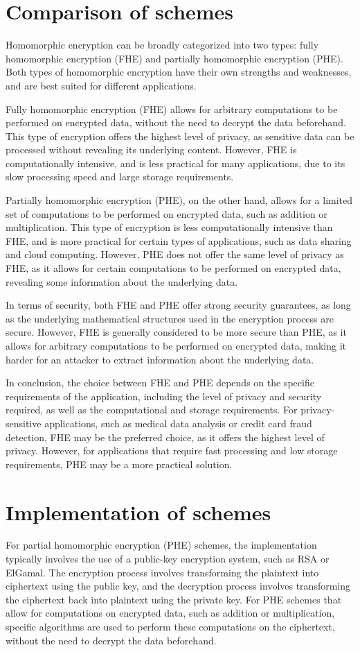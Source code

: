 \documentclass[a4paper,11pt]{report}
\begin{document}
\section{Comparison of schemes}
Homomorphic encryption can be broadly categorized into two types: fully homomorphic encryption (FHE) and partially homomorphic encryption (PHE). Both types of homomorphic encryption have their own strengths and weaknesses, and are best suited for different applications.

Fully homomorphic encryption (FHE) allows for arbitrary computations to be performed on encrypted data, without the need to decrypt the data beforehand. This type of encryption offers the highest level of privacy, as sensitive data can be processed without revealing its underlying content. However, FHE is computationally intensive, and is less practical for many applications, due to its slow processing speed and large storage requirements.

Partially homomorphic encryption (PHE), on the other hand, allows for a limited set of computations to be performed on encrypted data, such as addition or multiplication. This type of encryption is less computationally intensive than FHE, and is more practical for certain types of applications, such as data sharing and cloud computing. However, PHE does not offer the same level of privacy as FHE, as it allows for certain computations to be performed on encrypted data, revealing some information about the underlying data.

In terms of security, both FHE and PHE offer strong security guarantees, as long as the underlying mathematical structures used in the encryption process are secure. However, FHE is generally considered to be more secure than PHE, as it allows for arbitrary computations to be performed on encrypted data, making it harder for an attacker to extract information about the underlying data.

In conclusion, the choice between FHE and PHE depends on the specific requirements of the application, including the level of privacy and security required, as well as the computational and storage requirements. For privacy-sensitive applications, such as medical data analysis or credit card fraud detection, FHE may be the preferred choice, as it offers the highest level of privacy. However, for applications that require fast processing and low storage requirements, PHE may be a more practical solution.
\section{Implementation of schemes}
For partial homomorphic encryption (PHE) schemes, the implementation typically involves the use of a public-key encryption system, such as RSA or ElGamal. The encryption process involves transforming the plaintext into ciphertext using the public key, and the decryption process involves transforming the ciphertext back into plaintext using the private key. For PHE schemes that allow for computations on encrypted data, such as addition or multiplication, specific algorithms are used to perform these computations on the ciphertext, without the need to decrypt the data beforehand.
\end{document}
